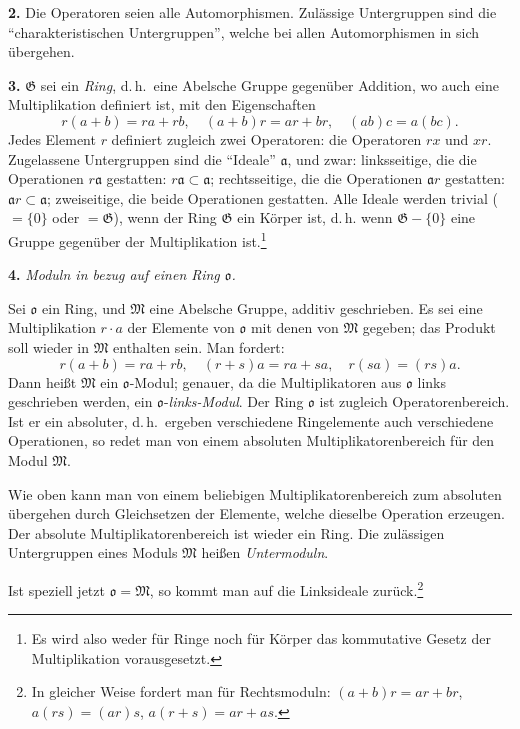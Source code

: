 \documentclass[12pt,a4paper]{article}
\newcommand{\ideala}{\mathfrak{a}}
\theoremstyle{definition}
\begin{document}
\textbf{2.} Die Operatoren seien alle Automorphismen. Zul\"assige
Untergruppen sind die ``charakteristischen Untergruppen'', welche bei
allen Automorphismen in sich \"ubergehen.

\textbf{3.} $\mathfrak{G}$ sei ein \textit{Ring}, d.\,h.\ eine Abelsche
Gruppe gegen\"uber Addition, wo auch eine Multiplikation definiert ist,
mit den Eigenschaften
\[
r(a+b) = ra + rb, \quad (a+b)r = ar + br, \quad (ab)c = a(bc).
\]
Jedes Element $r$ definiert zugleich zwei Operatoren: die Operatoren
$rx$ und $xr$. Zugelassene Untergruppen sind die ``Ideale'' $\ideala$,
und zwar: linksseitige, die die Operationen $r\ideala$ gestatten:
$r\ideala \subset \ideala$; rechtsseitige, die die Operationen
$\ideala r$ gestatten: $\ideala r \subset \ideala$; zweiseitige, die
beide Operationen gestatten. Alle Ideale werden trivial ($= \{0\}$ oder
$= \mathfrak{G}$), wenn der Ring $\mathfrak{G}$ ein K\"orper ist, d.\,h. wenn $\mathfrak{G} - \{0\}$ eine Gruppe gegen\"uber der Multiplikation
ist.\footnote{Es wird also weder f\"ur Ringe noch f\"ur K\"orper das
kommutative Gesetz der Multiplikation vorausgesetzt.}

\textbf{4.} \textit{Moduln in bezug auf einen Ring $\mathfrak{o}$.}

Sei $\mathfrak{o}$ ein Ring, und $\mathfrak{M}$ eine Abelsche Gruppe,
additiv geschrieben. Es sei eine Multiplikation $r \cdot a$ der Elemente
von $\mathfrak{o}$ mit denen von $\mathfrak{M}$ gegeben; das Produkt soll
wieder in $\mathfrak{M}$ enthalten sein. Man fordert:
\[
r(a+b) = ra + rb, \quad (r+s)a = ra + sa, \quad r(sa) = (rs)a.
\]
Dann hei\ss t $\mathfrak{M}$ ein $\mathfrak{o}$-Modul; genauer, da die
Multiplikatoren aus $\mathfrak{o}$ links geschrieben werden, ein
$\mathfrak{o}$-\textit{links-Modul}. Der Ring $\mathfrak{o}$ ist zugleich
Operatorenbereich. Ist er ein absoluter, d.\,h.\ ergeben verschiedene
Ringelemente auch verschiedene Operationen, so redet man von einem
absoluten Multiplikatorenbereich f\"ur den Modul $\mathfrak{M}$.

Wie oben kann man von einem beliebigen Multiplikatorenbereich zum
absoluten \"ubergehen durch Gleichsetzen der Elemente, welche dieselbe
Operation erzeugen. Der absolute Multiplikatorenbereich ist wieder ein
Ring. Die zul\"assigen Untergruppen eines Moduls $\mathfrak{M}$ hei\ss en
\textit{Untermoduln}.

Ist speziell jetzt $\mathfrak{o} = \mathfrak{M}$, so kommt man auf die
Linksideale zur\"uck.\footnote{In gleicher Weise fordert man f\"ur
Rechtsmoduln: $(a+b)r = ar + br$, $a(rs) = (ar)s$, $a(r+s) = ar + as$.}
\end{document}
